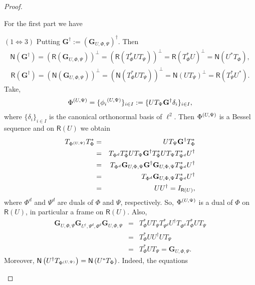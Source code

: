 \documentclass{birkjour}
\theoremstyle{definition}
\theoremstyle{remark}
\numberwithin{equation}{section}
\newcommand{\range}[1]{\mathsf{R}\left( #1 \right)}
\newcommand{\kernel}[1]{\mathsf{N}\left( #1 \right)}
\begin{document}
\begin{proof} 
\begin{enumerate}
For the first part we have

$(1\Leftrightarrow 3)$
Putting $\mathbf{G}^{\dag}:=\left(\mathbf{G}_{U,\Phi,\Psi}\right)^{\dag}$. Then
\begin{eqnarray}\label{salib3}
\kernel{\mathbf{G}^{\dag}}=\left(\range{\mathbf{G}_{U,\Phi,\Psi}}\right)^{\perp}=\left(\range{T_{\Phi}^{*}UT_{\Psi}}\right)^{\perp}=
\range{T_{\Phi}^{*}U}^{\perp}=
\kernel{U^*T_{\Phi}},
\end{eqnarray}
\begin{eqnarray}\label{salib4}
\range{\mathbf{G}^{\dag}}=\left(\kernel{\mathbf{G}_{U,\Phi,\Psi}}\right)^{\perp}=\left(\kernel{T_{\Phi}^{*}UT_{\Psi}}\right)^{\perp}=
 \kernel{UT_{\Psi}}^{\perp}=
\range{T_{\Psi}^*U^*}.
\end{eqnarray}
Take,
\begin{eqnarray}\label{fisalib}
\Phi^{\left(U,\Psi\right)}=\{{\phi_i}^{(U,\Psi)}\}_{i\in
I}:=\{UT_{\Psi}\mathbf{G}^{\dag}\delta_{i}\}_{i\in I},
\end{eqnarray}
where $\{\delta_i\}_{i\in I}$ is the canonical orthonormal basis
of $\ell^2$. Then $\Phi^{\left(U,\Psi\right)}$ is a Bessel sequence and on $\range{U}$
we obtain
\begin{eqnarray*}
T_{\Phisd}T_{\Phi}^*&=&UT_{\Psi}\mathbf{G}^{\dag}T_{\Phi}^{*}\\
 &=&T_{\Phi^d}T_{\Phi}^*UT_{\Psi}\mathbf{G}^{\dag}T_{\Phi}^{*}U
 T_{\Psi}T_{\Psi^d}^*U^{\dag}\\
 &=&T_{\Phi^d}\mathbf{G}_{U,\Phi,\Psi}\mathbf{G}^{\dag}\mathbf{G}_{U,\Phi,\Psi}T_{\Psi^d}^*U^{\dag}\\
 &=&T_{\Phi^d}\mathbf{G}_{U,\Phi,\Psi}T_{\Psi^d}^*U^{\dag}\\
 &=& UU^{\dag}=I_{\range{U}},
\end{eqnarray*}
where  $\Phi^{d}$ and $\Psi^{d}$   are duals of $\Phi$ and $\Psi$, respectively.
So, $\Phi^{\left(U,\Psi\right)}$ is a dual of $\Phi$ on $\range{U}$, in particular a frame on $\range{U}$.
Also,
\begin{eqnarray*}
\mathbf{G}_{U,\Phi,\Psi}\mathbf{G}_{U^{\dag},\Psi^{d},\Phi^{d}}\mathbf{G}_{U,\Phi,\Psi}& =&
T_{\Phi}^{*}UT_{\Psi}T_{\Psi^d}^{*}U^{\dag}T_{\Phi^d}T_{\Phi}^{*}UT_{\Psi}\\
&=&T_{\Phi}^{*}UU^{\dag}UT_{\Psi}\\
&=&T_{\Phi}^{*}UT_{\Psi}=\mathbf{G}_{U,\Phi,\Psi}.
\end{eqnarray*}
Moreover,
$\kernel{U^{\dag}T_{\Phisd}}=\kernel{U^*T_{\Phi}}$. Indeed, the equations

\end{enumerate}
\end{proof}
\end{document}
